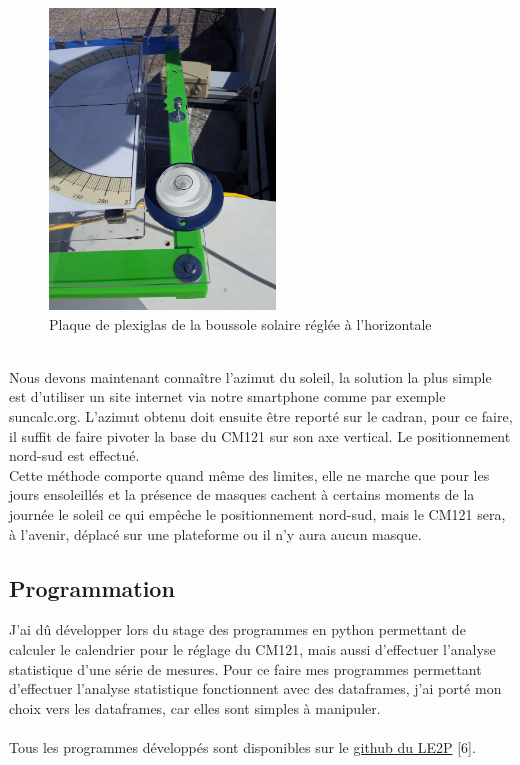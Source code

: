 \documentclass[12pt,a4paper]{article}
\begin{document}
\begin{flushleft}
 \begin{figure}[H]
\centering
\includegraphics[width=6cm, angle=-90]{image/montage/boussole_solaire/7.jpg} 
\caption{Plaque de plexiglas de la boussole solaire réglée à l'horizontale}
\end{figure}
~\\
Nous devons maintenant connaître l'azimut du soleil, la solution la plus simple est d'utiliser un site internet via notre smartphone comme par exemple suncalc.org. L'azimut obtenu doit ensuite être reporté sur le cadran, pour ce faire, il suffit de faire pivoter la base du CM121 sur son axe vertical. Le positionnement nord-sud est effectué.\\
Cette méthode comporte quand même des limites, elle ne marche que pour les jours ensoleillés et la présence de masques cachent à certains moments de la journée le soleil ce qui empêche le positionnement nord-sud, mais le CM121 sera, à l'avenir, déplacé sur une plateforme ou il n'y aura aucun masque.  
 

\subsection{Programmation}

J'ai dû développer lors du stage des programmes en python permettant de calculer le calendrier pour le réglage du CM121, mais aussi d'effectuer l'analyse statistique d'une série de mesures. Pour ce faire mes programmes permettant d'effectuer l'analyse statistique fonctionnent avec des dataframes, j'ai porté mon choix vers les dataframes, car elles sont simples à manipuler.\\
~\\
Tous les programmes développés sont disponibles sur le \href{https://github.com/LE2P/pyranometre\_arc\_ombrage}{github du LE2P} [6].


\end{flushleft}
\end{document}
